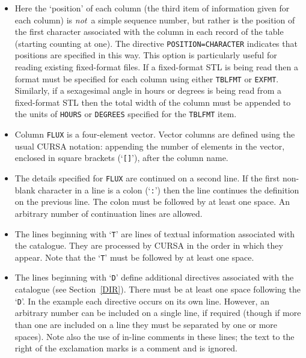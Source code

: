 \documentclass[twoside,11pt]{starlink}
\begin{document}
\begin{itemize}

  \item Here the `position' of each
   column (the third item of information given for each column) is
   \textit{not}\, a simple sequence number, but rather is the position
   of the first character associated with the column in each record of the
   table (starting counting at one).
   The directive \texttt{POSITION=CHARACTER} indicates that positions are
   specified in this way.  This option is particularly useful for
   reading existing fixed-format files.  If a fixed-format STL is
   being read then a format must be specified for each column using
   either \texttt{TBLFMT} or \texttt{EXFMT}.  Similarly, if a sexagesimal
   angle in hours or degrees is being read from a fixed-format STL
   then the total width of the column must be appended to the units
   of \texttt{HOURS} or \texttt{DEGREES} specified for the \texttt{TBLFMT}
   item.

  \item Column \texttt{FLUX} is a four-element vector.  Vector columns
   are defined using the usual CURSA notation: appending the number
   of elements in the vector, enclosed in square brackets (`\texttt{[]}'),
   after the column name.

  \item The details specified for \texttt{FLUX} are continued on a second
   line.  If the first non-blank character in a line is a colon (`\texttt{:}') then the line continues the definition on the previous line.
   The colon must be followed by at least one space.  An arbitrary
   number of continuation lines are allowed.

  \item The lines beginning with `\texttt{T}' are lines of textual
   information associated with the catalogue.  They are processed by
   CURSA in the order in which they appear.  Note that the `\texttt{T}'
   must be followed by at least one space.

  \item The lines beginning with `\texttt{D}' define additional directives
   associated with the catalogue (see Section~\ref{DIR}).  There
   must be at least one space following the `\texttt{D}'.  In the
   example each directive occurs on its own line.  However, an arbitrary
   number can be included on a single line, if required (though if more
   than one are included on a line they must be separated by one or
   more spaces).  Note also the use of in-line comments in these lines;
   the text to the right of the exclamation marks is a comment and is
   ignored.


\end{itemize}
\end{document}
